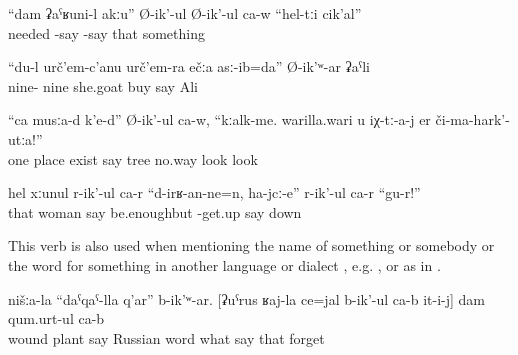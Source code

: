 \begin{exe}
	\ex	\label{ex:He says, I do not need these things}
	\gll	``dam	ʡaˁʁuni-l	akːu''	Ø-ik'-ul	Ø-ik'-ul ca-w	``hel-tːi	cik'al''\\
			needed		-say	-say 	that	something\\
	\glt	{}

	\ex	\label{ex:‎‎‎I bought 99 goats, said Ali}
	\gll	``du-l	urč'em-c'anu	urč'em-ra	ečːa	asː-ib=da''	Ø-ik'ʷ-ar	ʡaˁli	\\
			nine-	nine	she.goat	buy	say	Ali\\
	\glt	{}

	\ex	\label{ex:‎‎In once place, there are, he says, trees. Whatever may happen, do not look at these trees}
	\gll	``ca	musːa-d	k'e-d''	Ø-ik'-ul	ca-w,	``kːalk-me.	warilla.wari	u	iχ-tː-a-j	er	či-ma-hark'-utːa!''\\
		one	place	exist	say		tree	no.way			look	look\\
	\glt	{}

	\ex	\label{ex:‎‎The wife says, This is enough, get up}
	\gll	hel	xːunul	r-ik'-ul	ca-r	``d-irʁ-an-ne=n,	ha-jcː-e''	r-ik'-ul	ca-r	``gu-r!''\\
		that	woman	say		be.enoughbut	-get.up	say		down\\
	\glt	{}
\end{exe}

This verb is also used when mentioning the name of something or somebody or the word for something in another language or dialect , e.g.  , or as in .
%
\begin{exe}
	\ex	\label{ex:‎‎In our (language) it is called plant of the wound I forgot what it is called in Russian}
	\gll	nišːa-la	``daˁqaˁ-lla	q'ar''	b-ik'ʷ-ar.	[ʡuˁrus	ʁaj-la	ce=jal	b-ik'-ul	ca-b	it-i-j] dam	qum.urt-ul	ca-b\\
			wound	plant	say	Russian word	what	say		that		forget	\\
	\glt	{}
\end{exe}

